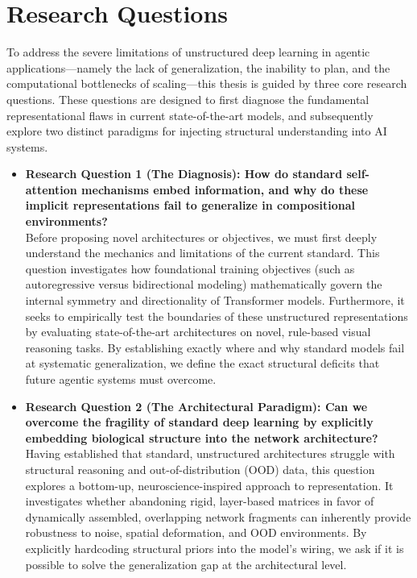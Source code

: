 \section{Research Questions}

To address the severe limitations of unstructured deep learning in agentic applications---namely the lack of generalization, the inability to plan, and the computational bottlenecks of scaling---this thesis is guided by three core research questions. These questions are designed to first diagnose the fundamental representational flaws in current state-of-the-art models, and subsequently explore two distinct paradigms for injecting structural understanding into AI systems.

\begin{itemize}
    \item \textbf{Research Question 1 (The Diagnosis): How do standard self-attention mechanisms embed information, and why do these implicit representations fail to generalize in compositional environments?}\\
    Before proposing novel architectures or objectives, we must first deeply understand the mechanics and limitations of the current standard. This question investigates how foundational training objectives (such as autoregressive versus bidirectional modeling) mathematically govern the internal symmetry and directionality of Transformer models. Furthermore, it seeks to empirically test the boundaries of these unstructured representations by evaluating state-of-the-art architectures on novel, rule-based visual reasoning tasks. By establishing exactly where and why standard models fail at systematic generalization, we define the exact structural deficits that future agentic systems must overcome.

    \item \textbf{Research Question 2 (The Architectural Paradigm): Can we overcome the fragility of standard deep learning by explicitly embedding biological structure into the network architecture?}\\
    Having established that standard, unstructured architectures struggle with structural reasoning and out-of-distribution (OOD) data, this question explores a bottom-up, neuroscience-inspired approach to representation. It investigates whether abandoning rigid, layer-based matrices in favor of dynamically assembled, overlapping network fragments can inherently provide robustness to noise, spatial deformation, and OOD environments. By explicitly hardcoding structural priors into the model's wiring, we ask if it is possible to solve the generalization gap at the architectural level.


\end{itemize}
